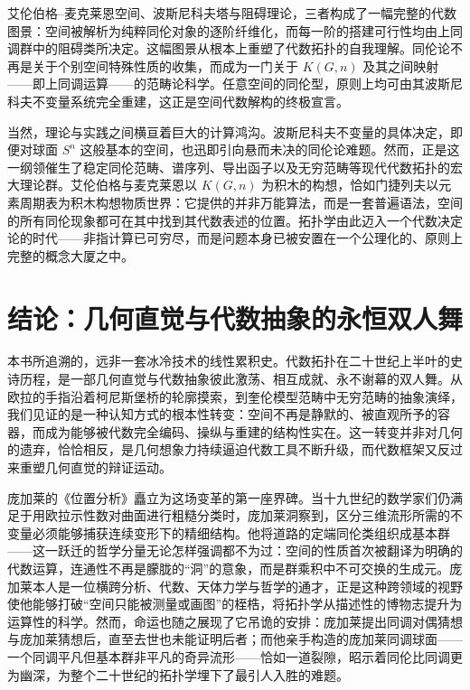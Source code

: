 \documentclass[12pt,a4paper]{article}
\begin{document}
艾伦伯格–麦克莱恩空间、波斯尼科夫塔与阻碍理论，三者构成了一幅完整的代数图景：空间被解析为纯粹同伦对象的逐阶纤维化，而每一阶的搭建可行性均由上同调群中的阻碍类所决定。这幅图景从根本上重塑了代数拓扑的自我理解。同伦论不再是关于个别空间特殊性质的收集，而成为一门关于 $K(G,n)$ 及其之间映射——即上同调运算——的范畴论科学。任意空间的同伦型，原则上均可由其波斯尼科夫不变量系统完全重建，这正是空间代数解构的终极宣言。

当然，理论与实践之间横亘着巨大的计算鸿沟。波斯尼科夫不变量的具体决定，即便对球面 $S^n$ 这般基本的空间，也迅即引向悬而未决的同伦论难题。然而，正是这一纲领催生了稳定同伦范畴、谱序列、导出函子以及无穷范畴等现代代数拓扑的宏大理论群。艾伦伯格与麦克莱恩以 $K(G,n)$ 为积木的构想，恰如门捷列夫以元素周期表为积木构想物质世界：它提供的并非万能算法，而是一套普遍语法，空间的所有同伦现象都可在其中找到其代数表述的位置。拓扑学由此迈入一个代数决定论的时代——非指计算已可穷尽，而是问题本身已被安置在一个公理化的、原则上完整的概念大厦之中。

\section{结论：几何直觉与代数抽象的永恒双人舞}

本书所追溯的，远非一套冰冷技术的线性累积史。代数拓扑在二十世纪上半叶的史诗历程，是一部几何直觉与代数抽象彼此激荡、相互成就、永不谢幕的双人舞。从欧拉的手指沿着柯尼斯堡桥的轮廓摸索，到奎伦模型范畴中无穷范畴的抽象演绎，我们见证的是一种认知方式的根本性转变：空间不再是静默的、被直观所予的容器，而成为能够被代数完全编码、操纵与重建的结构性实在。这一转变并非对几何的遗弃，恰恰相反，是几何想象力持续逼迫代数工具不断升级，而代数框架又反过来重塑几何直觉的辩证运动。

庞加莱的《位置分析》矗立为这场变革的第一座界碑。当十九世纪的数学家们仍满足于用欧拉示性数对曲面进行粗糙分类时，庞加莱洞察到，区分三维流形所需的不变量必须能够捕获连续变形下的精细结构。他将道路的定端同伦类组织成基本群——这一跃迁的哲学分量无论怎样强调都不为过：空间的性质首次被翻译为明确的代数运算，连通性不再是朦胧的“洞”的意象，而是群乘积中不可交换的生成元。庞加莱本人是一位横跨分析、代数、天体力学与哲学的通才，正是这种跨领域的视野使他能够打破“空间只能被测量或画图”的桎梏，将拓扑学从描述性的博物志提升为运算性的科学。然而，命运也随之展现了它吊诡的安排：庞加莱提出同调对偶猜想与庞加莱猜想后，直至去世也未能证明后者；而他亲手构造的庞加莱同调球面——一个同调平凡但基本群非平凡的奇异流形——恰如一道裂隙，昭示着同伦比同调更为幽深，为整个二十世纪的拓扑学埋下了最引人入胜的难题。
\end{document}
